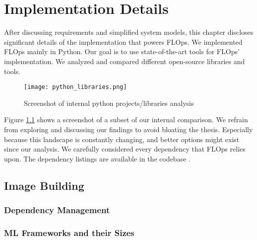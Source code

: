 \chapter{Implementation Details}

After discussing requirements and simplified system models, this chapter discloses significant details of the implementation that powers FLOps.
We implemented FLOps mainly in Python.
Our goal is to use state-of-the-art tools for FLOps' implementation.
We analyzed and compared different open-source libraries and tools.

\begin{figure}[h]
    \begin{adjustwidth}{-0.175\paperwidth}{-0.175\paperwidth}
        \centering
        \texttt{[image: python\_libraries.png]}
        \caption{Screenshot of internal python projects/libraries analysis}
        \label{fig:python_projects_libraries}
    \end{adjustwidth}
\end{figure}

Figure \ref{fig:python_projects_libraries} shows a screenshot of a subset of our internal comparison.
We refrain from exploring and discussing our findings to avoid bloating the thesis.
Especially because this landscape is constantly changing, and better options might exist since our analysis. 
We carefully considered every dependency that FLOps relies upon.
The dependency listings are available in the codebase \cite{flops_code}.



\section{Image Building}

    \subsection{Dependency Management}

    \subsection{ML Frameworks and their Sizes}

